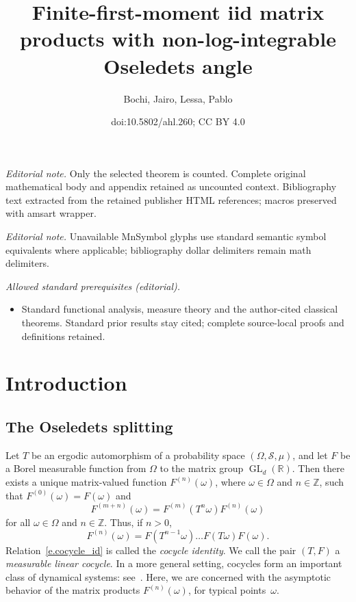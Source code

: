 \documentclass[10pt]{amsart}
\title{Finite-first-moment iid matrix products with non-log-integrable Oseledets angle}
\author{Bochi, Jairo, Lessa, Pablo}
\date{doi:10.5802/ahl.260; CC BY 4.0}
\theoremstyle{definition}\newtheorem{defi}[theo]{Definition}\newtheorem{rema}[theo]{Remark}\newtheorem{exam}[theo]{Example}\newtheorem{exem}[theo]{Example}\newtheorem{nota}[theo]{Notation}
\newcommand{\Z}{\mathbb{Z}}
\newcommand{\R}{\mathbb{R}}
\newcommand{\clS}{\mathcal{S}}
\DeclareMathOperator{\GL}{GL}
\begin{document}
\maketitle
\noindent\textit{Editorial note.} Only the selected theorem is counted. Complete original mathematical body and appendix retained as uncounted context. Bibliography text extracted from the retained publisher HTML references; macros preserved with amsart wrapper.\par\medskip
\noindent\textit{Editorial note.} Unavailable MnSymbol glyphs use standard semantic symbol equivalents where applicable; bibliography dollar delimiters remain math delimiters.\par\medskip
\noindent\textit{Allowed standard prerequisites (editorial).}\begin{itemize}
\item Standard functional analysis, measure theory and the author-cited classical theorems. Standard prior results stay cited; complete source-local proofs and definitions retained.
\end{itemize}\medskip

\section{Introduction}

\subsection{The Oseledets splitting}

Let $T$ be an ergodic automorphism of a probability space $(\Omega,\clS,\mu)$, and let $F$ be a Borel measurable function from $\Omega$ to the matrix group $\GL_d(\R)$. Then there exists a unique matrix-valued function $F^{(n)}(\omega)$, where $\omega \in \Omega$ and $n \in \Z$, such that $F^{(0)}(\omega) = F(\omega)$ and
\begin{equation}\label{e.cocycle_id}
F^{(m+n)}(\omega) = F^{(m)}(T^n \omega) F^{(n)}(\omega)
\end{equation}
for all $\omega \in \Omega$ and $n \in \Z$. Thus, if $n > 0$,
\begin{equation}
F^{(n)}(\omega) = F\left(T^{n-1} \omega\right)\dots F(T\omega) F(\omega).
\end{equation}
Relation~\eqref{e.cocycle_id} is called the \emph{cocycle identity}. We call the pair $(T,F)$ a \emph{measurable linear cocycle}. In a more general setting, cocycles form an important class of dynamical systems: see~\cite[Section~1.3.k]{HK}. Here, we are concerned with the asymptotic behavior of the matrix products $F^{(n)}(\omega)$, for typical points~$\omega$.
\end{document}
